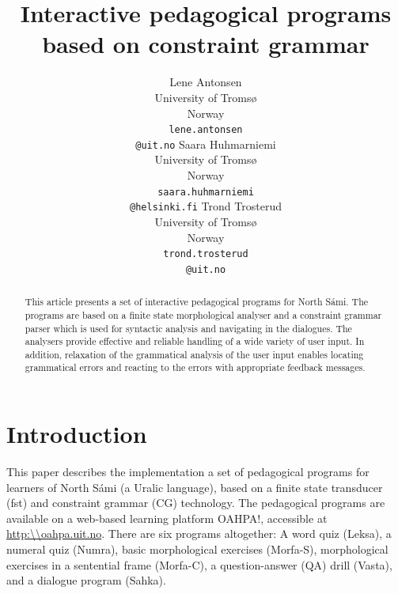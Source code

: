 \documentclass[11pt]{article}
\begin{document}
\title{Interactive pedagogical programs based on constraint grammar}


\author{Lene Antonsen\\
  University of Tromsø\\
  Norway\\
  {\tt lene.antonsen}\\{\tt @uit.no}  \And
  Saara Huhmarniemi\\
  University of Tromsø\\
  Norway\\
  {\tt saara.huhmarniemi}\\{\tt @helsinki.fi}  \And
  Trond Trosterud\\
  University of Tromsø\\
  Norway\\
  {\tt trond.trosterud}\\{\tt @uit.no}}

 
\maketitle

\begin{abstract}
This article presents a set of interactive pedagogical programs for North Sámi. The programs are based on a finite state morphological analyser and  a constraint grammar parser which is used for syntactic analysis and navigating in the dialogues. The analysers provide effective and reliable handling of a wide variety of user input. In addition, relaxation of the grammatical analysis of the user input enables locating grammatical errors and reacting to the errors with appropriate feedback messages. 
\end{abstract}

\section{Introduction}
This paper describes the implementation a set of pedagogical programs for learners of North Sámi (a Uralic language), based on a finite state transducer (fst) and constraint grammar (CG) technology. %
The pedagogical programs are available on a web-based learning platform OAHPA!, accessible at \url{http:\\oahpa.uit.no}. There are six programs altogether: A word quiz (Leksa), a numeral quiz (Numra), basic morphological exercises (Morfa-S), morphological exercises in a sentential frame (Morfa-C), a question-answer (QA) drill (Vasta), and a dialogue program (Sahka).
\end{document}
